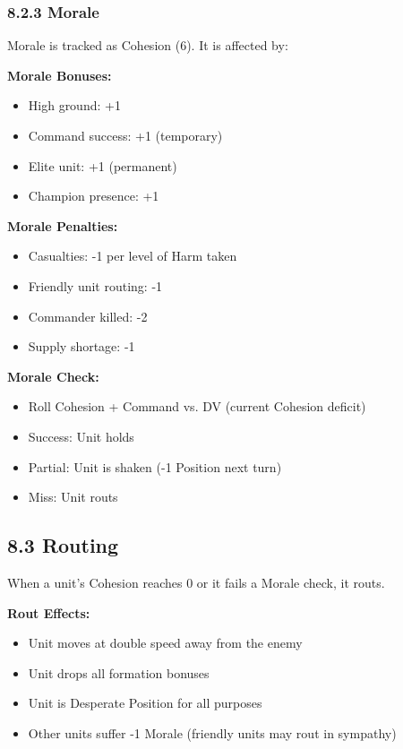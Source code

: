\documentclass[11pt]{article}
\begin{document}
\subsubsection{8.2.3 Morale}

Morale is tracked as Cohesion (6). It is affected by:

\textbf{Morale Bonuses:}
\begin{itemize}
  \item High ground: +1
  \item Command success: +1 (temporary)
  \item Elite unit: +1 (permanent)
  \item Champion presence: +1
\end{itemize}

\textbf{Morale Penalties:}
\begin{itemize}
  \item Casualties: -1 per level of Harm taken
  \item Friendly unit routing: -1
  \item Commander killed: -2
  \item Supply shortage: -1
\end{itemize}

\textbf{Morale Check:}
\begin{itemize}
  \item Roll Cohesion + Command vs. DV (current Cohesion deficit)
  \item Success: Unit holds
  \item Partial: Unit is shaken (-1 Position next turn)
  \item Miss: Unit routs
\end{itemize}

\subsection{8.3 Routing}

When a unit's Cohesion reaches 0 or it fails a Morale check, it routs.

\textbf{Rout Effects:}
\begin{itemize}
  \item Unit moves at double speed away from the enemy
  \item Unit drops all formation bonuses
  \item Unit is Desperate Position for all purposes
  \item Other units suffer -1 Morale (friendly units may rout in sympathy)
\end{itemize}
\end{document}
